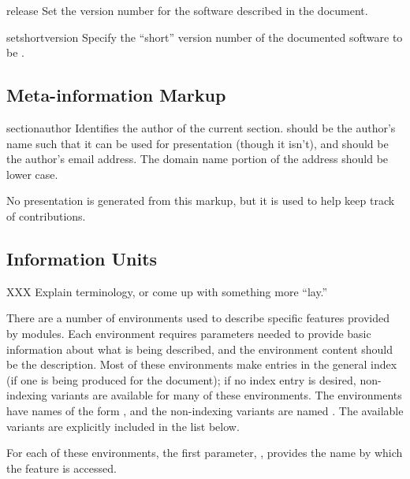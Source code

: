 \documentclass{howto}
\begin{document}
    \begin{macrodesc}{release}{}
      Set the version number for the software described in the
      document.
    \end{macrodesc}

    \begin{macrodesc}{setshortversion}{}
      Specify the ``short'' version number of the documented software
      to be .
    \end{macrodesc}

  \subsection{Meta-information Markup \label{meta-info}}

    \begin{macrodesc}{sectionauthor}{}
      Identifies the author of the current section.  
      should be the author's name such that it can be used for
      presentation (though it isn't), and  should be the
      author's email address.  The domain name portion of
      the address should be lower case.

      No presentation is generated from this markup, but it is used to 
      help keep track of contributions.
    \end{macrodesc}

  \subsection{Information Units \label{info-units}}

    XXX Explain terminology, or come up with something more ``lay.''

    There are a number of environments used to describe specific
    features provided by modules.  Each environment requires
    parameters needed to provide basic information about what is being
    described, and the environment content should be the description.
    Most of these environments make entries in the general index (if
    one is being produced for the document); if no index entry is
    desired, non-indexing variants are available for many of these
    environments.  The environments have names of the form
    , and the non-indexing variants are named
    .  The available variants are explicitly
    included in the list below.

    For each of these environments, the first parameter, ,
    provides the name by which the feature is accessed.
\end{document}
